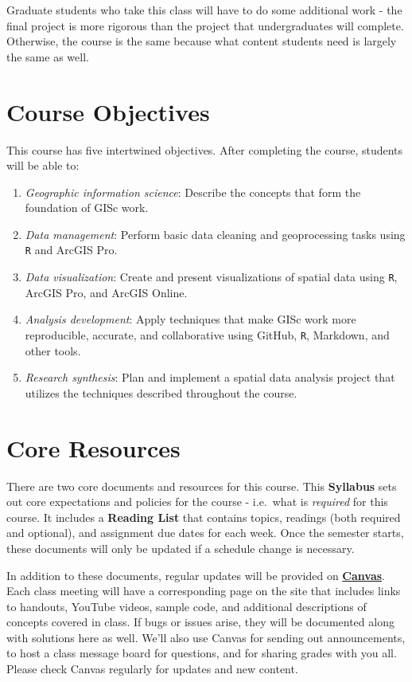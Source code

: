 \documentclass[
]{book}
\begin{document}
Graduate students who take this class will have to do some additional work - the final project is more rigorous than the project that undergraduates will complete. Otherwise, the course is the same because what content students need is largely the same as well.

\hypertarget{course-objectives}{%
\section{Course Objectives}\label{course-objectives}}

This course has five intertwined objectives. After completing the course, students will be able to:

\begin{enumerate}
\def\labelenumi{\arabic{enumi}.}
\item
  \emph{Geographic information science}: Describe the concepts that form the foundation of GISc work.
\item
  \emph{Data management}: Perform basic data cleaning and geoprocessing tasks using \texttt{R} and ArcGIS Pro.
\item
  \emph{Data visualization}: Create and present visualizations of spatial data using \texttt{R}, ArcGIS Pro, and ArcGIS Online.
\item
  \emph{Analysis development}: Apply techniques that make GISc work more reproducible, accurate, and collaborative using GitHub, \texttt{R}, Markdown, and other tools.
\item
  \emph{Research synthesis}: Plan and implement a spatial data analysis project that utilizes the techniques described throughout the course.
\end{enumerate}

\hypertarget{core-resources}{%
\section{Core Resources}\label{core-resources}}

There are two core documents and resources for this course. This \textbf{Syllabus} sets out core expectations and policies for the course - i.e.~what is \emph{required} for this course. It includes a \textbf{Reading List} that contains topics, readings (both required and optional), and assignment due dates for each week. Once the semester starts, these documents will only be updated if a schedule change is necessary.

In addition to these documents, regular updates will be provided on \href{https://canvas.slu.edu}{\textbf{Canvas}}. Each class meeting will have a corresponding page on the site that includes links to handouts, YouTube videos, sample code, and additional descriptions of concepts covered in class. If bugs or issues arise, they will be documented along with solutions here as well. We'll also use Canvas for sending out announcements, to host a class message board for questions, and for sharing grades with you all. Please check Canvas regularly for updates and new content.
\end{document}
